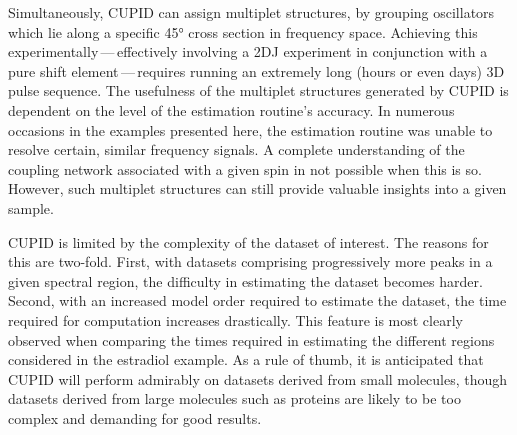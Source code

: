 Simultaneously, \ac{CUPID} can assign multiplet structures,
by grouping oscillators which lie along a specific \ang{45} cross section in
frequency space. Achieving this experimentally\,---\,effectively involving
a \ac{2DJ} experiment in conjunction with a pure shift element\,---\,requires
running an extremely long (hours or even days) \ac{3D} pulse sequence. The
usefulness of the multiplet structures generated by \ac{CUPID} is dependent on
the level of the estimation routine's accuracy. In
numerous occasions in the examples presented here, the estimation routine was
unable to resolve certain, similar frequency signals. A complete understanding
of the coupling network associated with a given spin in not possible when
this is so. However, such multiplet structures can still provide valuable
insights into a given sample.

\ac{CUPID} is limited by the complexity of the dataset of interest. The reasons
for this are two-fold. First, with datasets comprising progressively more peaks
in a given spectral region, the difficulty in estimating the dataset becomes
harder. Second, with an increased model order required to estimate the dataset,
the time required for computation increases drastically. This feature is
most clearly observed when comparing the times required in estimating the
different regions considered in the estradiol example. As a rule of thumb, it is
anticipated that \ac{CUPID} will perform admirably on datasets derived from
small molecules, though datasets derived from large molecules such as proteins
are likely to be too complex and demanding for good results.
